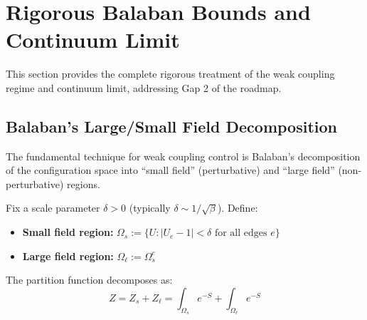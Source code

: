 \section{Rigorous Balaban Bounds and Continuum Limit}
\label{sec:balaban-continuum}
\label{app:gap3-balaban-fermions}

This section provides the complete rigorous treatment of the weak coupling 
regime and continuum limit, addressing Gap 2 of the roadmap.

\subsection{Balaban's Large/Small Field Decomposition}
\label{subsec:balaban-decomposition}

The fundamental technique for weak coupling control is Balaban's decomposition 
of the configuration space into ``small field'' (perturbative) and ``large field'' 
(non-perturbative) regions.

\begin{definition}
\label{def:small-large-field}
Fix a scale parameter $\delta > 0$ (typically $\delta \sim 1/\sqrt{\beta}$). Define:
\begin{itemize}
\item \textbf{Small field region:} $\Omega_s := \{U : |U_e - 1| < \delta \text{ for all edges } e\}$
\item \textbf{Large field region:} $\Omega_\ell := \Omega_s^c$
\end{itemize}

The partition function decomposes as:
\[
Z = Z_s + Z_\ell = \int_{\Omega_s} e^{-S} + \int_{\Omega_\ell} e^{-S}
\]
\end{definition}

